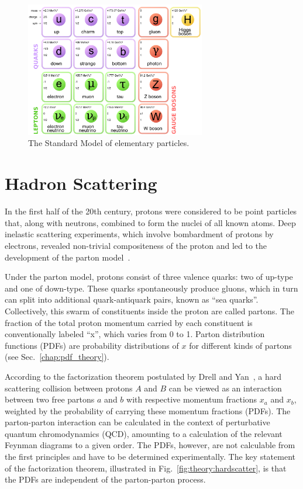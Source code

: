 \begin{figure}[phtb]
  \begin{center}
    \includegraphics[width=0.7\textwidth]{theory/fig/SM}
    \caption{ The Standard Model of elementary particles.}
    \label{fig:theory:SM}
 \end{center}
\end{figure}

\section{ Hadron Scattering }
\label{chap:qcd_theory}


In the first half of the 20th century, protons were considered to be point particles that, along with neutrons, combined to form the nuclei of all known atoms. Deep inelastic scattering experiments, which involve bombardment of protons by electrons, revealed non-trivial compositeness of the proton and led to the development of the parton model~\cite{PhysRevLett.23.1415}.

Under the parton model, protons consist of three valence quarks: two of up-type and one of down-type. These quarks spontaneously produce gluons, which in turn can split into additional quark-antiquark pairs, known as ``sea quarks''. Collectively, this swarm of constituents inside the proton are called partons. The fraction of the total proton momentum carried by each constituent is conventionally labeled ``x'', which varies from 0 to 1. Parton distribution functions (PDFs) are probability distributions of $x$ for different kinds of partons (see Sec.~\ref{chap:pdf_theory}).

According to the factorization theorem postulated by Drell and Yan~\cite{PhysRevLett.25.316}, a hard scattering collision between protons $A$ and $B$ can be viewed as an interaction between two free partons $a$ and $b$ with respective momentum fractions $x_a$ and $x_b$, weighted by the probability of carrying these momentum fractions (PDFs). The parton-parton interaction can be calculated in the context of perturbative quantum chromodynamics (QCD), amounting to a calculation of the relevant Feynman diagrams to a given order. The PDFs, however, are not calculable from the first principles and have to be determined experimentally. The key statement of the factorization theorem, illustrated in Fig.~\ref{fig:theory:hardscatter}, is that the PDFs are independent of the parton-parton process.

